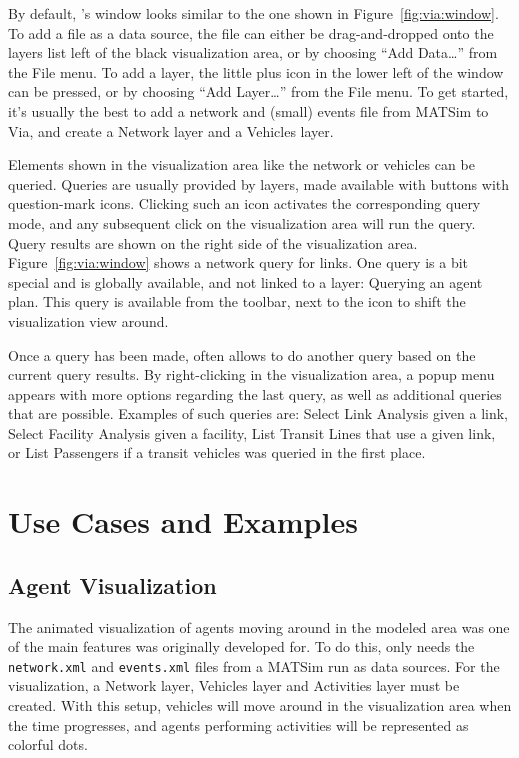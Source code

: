 By default, \Via{}'s window looks similar to the one shown in
Figure~\ref{fig:via:window}.
To add a file as a data source, the file can either be drag-and-dropped onto the layers
list left of the black visualization area, or by choosing ``Add Data\ldots''
from the File menu. To add a layer, the little plus icon in the lower left of
the window can be pressed, or by choosing ``Add Layer\ldots'' from the File
menu. To get started, it's usually the best to add a network and (small) events
file from MATSim to Via, and create a Network layer and a Vehicles layer.

Elements shown in the visualization area like the network or vehicles can
be queried. Queries are usually provided by layers, made available with buttons
with question-mark icons. Clicking such an icon activates the corresponding
query mode, and any subsequent click on the visualization area will run the
query.
Query results are shown on the right side of the visualization area.
Figure~\ref{fig:via:window} shows a network query for links.
One query is a bit special and is globally available, and not linked to a
layer: Querying an agent plan. This query is available from the toolbar, next to
the icon to shift the visualization view around.

Once a query has been made, \Via{} often allows to do another query based on the
current query results. By right-clicking in the visualization area, a popup menu
appears with more options regarding the last query, as well as additional
queries that are possible. Examples of such queries are: Select Link Analysis
given a link, Select Facility Analysis given a facility, List Transit Lines that
use a given link, or List Passengers if a transit vehicles was queried in the
first place.



\section{Use Cases and Examples}

\subsection{Agent Visualization}

The animated visualization of agents moving around in the modeled area was one
of the main features \Via{} was originally developed for. To do this, \Via{}
only needs the {\tt network.xml} and {\tt events.xml} files from a MATSim run
as data sources. For the visualization, a Network layer, Vehicles layer and
Activities layer must be created. With this setup, vehicles will move around in
the visualization area when the time progresses, and agents performing
activities will be represented as colorful dots.

